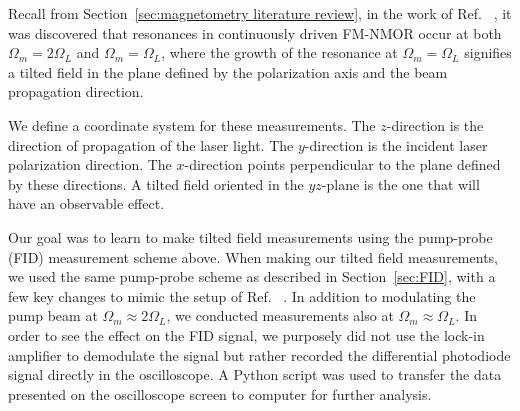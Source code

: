 
Recall from Section~\ref{sec:magnetometry literature review}, in the work of
Ref.~\cite{PhysRevA.74.063420} , it was discovered that resonances in
continuously driven FM-NMOR occur at both $\Omega_m=2\Omega_L$ and
$\Omega_m=\Omega_L$, where the growth of the resonance at
$\Omega_m=\Omega_L$ signifies a tilted field in the plane defined by
the polarization axis and the beam propagation direction.

We define a coordinate system for these measurements.  The
$z$-direction is the direction of propagation of the laser light.  The
$y$-direction is the incident laser polarization direction.  The
$x$-direction points perpendicular to the plane defined by these
directions.  A tilted field oriented in the $yz$-plane is the one that
will have an observable effect.

Our goal was to learn to make tilted field measurements using the
pump-probe (FID) measurement scheme above.  When making our tilted
field measurements, we used the same pump-probe scheme as described in
Section~\ref{sec:FID}, with a few key changes to mimic the setup of
Ref.~\cite{PhysRevA.74.063420} .  In addition to modulating the pump beam at
$\Omega_m\approx 2\Omega_L$, we conducted measurements also at
$\Omega_m\approx\Omega_L$.  In order to see the effect on the FID
signal, we purposely did not use the lock-in amplifier to demodulate
the signal but rather recorded the differential photodiode signal
directly in the oscilloscope.  A Python script was used to transfer
the data presented on the oscilloscope screen to computer for further
analysis.

